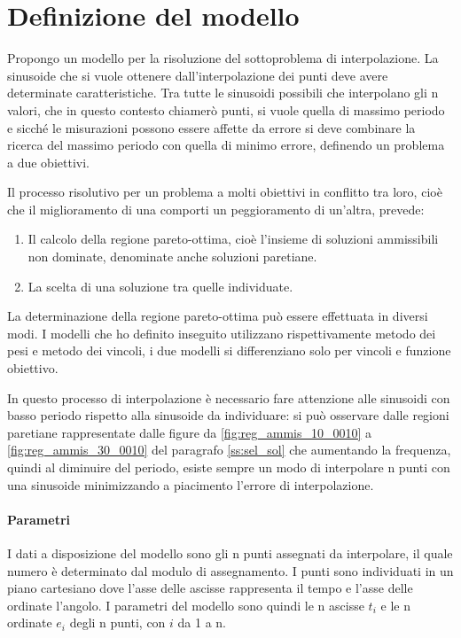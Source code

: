 \documentclass[a4paper,12pt]{report}
\begin{document}
\section{Definizione del modello}
Propongo un modello per la risoluzione del sottoproblema di interpolazione.
La sinusoide che si vuole ottenere dall'interpolazione dei punti deve avere determinate caratteristiche. Tra tutte le sinusoidi possibili che interpolano gli n valori, che in questo contesto chiamerò punti, si vuole quella di massimo periodo e sicché le misurazioni possono essere affette da errore si deve combinare la ricerca del massimo periodo con quella di minimo errore, definendo un problema a due obiettivi.

Il processo risolutivo per un problema a molti obiettivi in conflitto tra loro, cioè che il miglioramento di una comporti un peggioramento di un'altra, prevede:
\begin{enumerate}
  \item Il calcolo della regione pareto-ottima, cioè l'insieme di soluzioni ammissibili non dominate, denominate anche soluzioni paretiane.
  \item La scelta di una soluzione tra quelle individuate.
\end{enumerate}
La determinazione della regione pareto-ottima può essere effettuata in diversi modi. I modelli che ho definito inseguito utilizzano rispettivamente metodo dei pesi e metodo dei vincoli, i due modelli si differenziano solo per vincoli e funzione obiettivo.

In questo processo di interpolazione è necessario fare attenzione alle sinusoidi con basso periodo rispetto alla sinusoide da individuare: si può osservare dalle regioni paretiane rappresentate dalle figure da \ref{fig:reg_ammis_10_0010} a \ref{fig:reg_ammis_30_0010} del paragrafo \ref{ss:sel_sol} che aumentando la frequenza, quindi al diminuire del periodo, esiste sempre un modo di interpolare n punti con una sinusoide minimizzando a piacimento l'errore di interpolazione.

\paragraph{Parametri}

I dati a disposizione del modello sono gli n punti assegnati da interpolare, il quale numero è determinato dal modulo di assegnamento. I punti sono individuati in un piano cartesiano dove l'asse delle ascisse rappresenta il tempo e l'asse delle ordinate l'angolo. I parametri del modello sono quindi le n ascisse $t_i$ e le n ordinate $e_i$ degli n punti, con $i$ da 1 a n.
\end{document}
